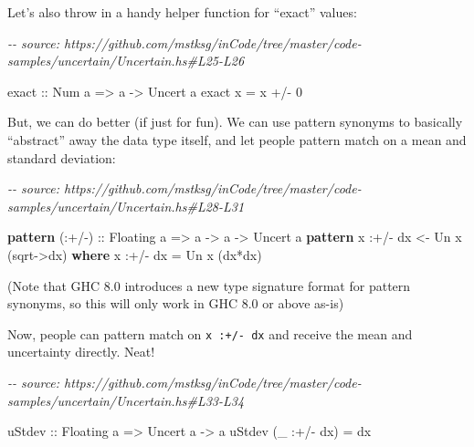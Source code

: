 \documentclass[]{article}
\newenvironment{Shaded}{}{}
\newcommand{\CommentTok}[1]{\textcolor[rgb]{0.38,0.63,0.69}{\textit{#1}}}
\newcommand{\DataTypeTok}[1]{\textcolor[rgb]{0.56,0.13,0.00}{#1}}
\newcommand{\DecValTok}[1]{\textcolor[rgb]{0.25,0.63,0.44}{#1}}
\newcommand{\FunctionTok}[1]{\textcolor[rgb]{0.02,0.16,0.49}{#1}}
\newcommand{\KeywordTok}[1]{\textcolor[rgb]{0.00,0.44,0.13}{\textbf{#1}}}
\newcommand{\NormalTok}[1]{#1}
\newcommand{\OperatorTok}[1]{\textcolor[rgb]{0.40,0.40,0.40}{#1}}
\newcommand{\OtherTok}[1]{\textcolor[rgb]{0.00,0.44,0.13}{#1}}
\begin{document}
Let's also throw in a handy helper function for ``exact'' values:

\begin{Shaded}
\begin{Highlighting}[]
\CommentTok{{-}{-} source: https://github.com/mstksg/inCode/tree/master/code{-}samples/uncertain/Uncertain.hs\#L25{-}L26}

\OtherTok{exact ::} \DataTypeTok{Num}\NormalTok{ a }\OtherTok{=\textgreater{}}\NormalTok{ a }\OtherTok{{-}\textgreater{}} \DataTypeTok{Uncert}\NormalTok{ a}
\NormalTok{exact x }\OtherTok{=}\NormalTok{ x }\OperatorTok{+/{-}} \DecValTok{0}
\end{Highlighting}
\end{Shaded}

But, we can do better (if just for fun). We can use pattern synonyms to
basically ``abstract'' away the data type itself, and let people pattern match
on a mean and standard deviation:

\begin{Shaded}
\begin{Highlighting}[]
\CommentTok{{-}{-} source: https://github.com/mstksg/inCode/tree/master/code{-}samples/uncertain/Uncertain.hs\#L28{-}L31}

\KeywordTok{pattern}\OtherTok{ (:+/{-}) ::} \DataTypeTok{Floating}\NormalTok{ a }\OtherTok{=\textgreater{}}\NormalTok{ a }\OtherTok{{-}\textgreater{}}\NormalTok{ a }\OtherTok{{-}\textgreater{}} \DataTypeTok{Uncert}\NormalTok{ a}
\KeywordTok{pattern}\NormalTok{ x }\OperatorTok{:+/{-}}\NormalTok{ dx }\OtherTok{\textless{}{-}} \DataTypeTok{Un}\NormalTok{ x (}\FunctionTok{sqrt}\OtherTok{{-}\textgreater{}}\NormalTok{dx)}
  \KeywordTok{where}
\NormalTok{    x }\OperatorTok{:+/{-}}\NormalTok{ dx }\OtherTok{=} \DataTypeTok{Un}\NormalTok{ x (dx}\OperatorTok{*}\NormalTok{dx)}
\end{Highlighting}
\end{Shaded}

(Note that GHC 8.0 introduces a new type signature format for pattern synonyms,
so this will only work in GHC 8.0 or above as-is)

Now, people can pattern match on \texttt{x\ :+/-\ dx} and receive the mean and
uncertainty directly. Neat!

\begin{Shaded}
\begin{Highlighting}[]
\CommentTok{{-}{-} source: https://github.com/mstksg/inCode/tree/master/code{-}samples/uncertain/Uncertain.hs\#L33{-}L34}

\OtherTok{uStdev ::} \DataTypeTok{Floating}\NormalTok{ a }\OtherTok{=\textgreater{}} \DataTypeTok{Uncert}\NormalTok{ a }\OtherTok{{-}\textgreater{}}\NormalTok{ a}
\NormalTok{uStdev (\_ }\OperatorTok{:+/{-}}\NormalTok{ dx) }\OtherTok{=}\NormalTok{ dx}
\end{Highlighting}
\end{Shaded}
\end{document}
